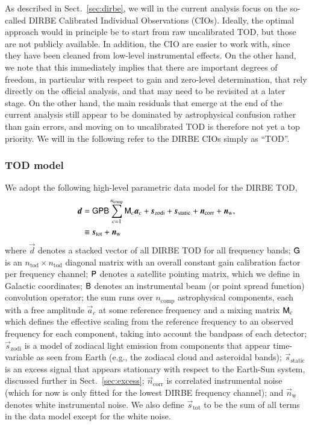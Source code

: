\documentclass{aa}
\newcommand{\dv}[0]{\vec{d}}
\newcommand{\B}[0]{\tens{B}}
\newcommand{\G}[0]{\tens{G}}
\newcommand{\n}[0]{\vec{n}}
\newcommand{\s}[0]{\vec{s}}
\renewcommand{\a}[0]{\vec{a}}
\newcommand{\M}[0]{\tens{M}}
\renewcommand{\P}[0]{\tens{P}}
\begin{document}
As described in Sect.~\ref{sec:dirbe}, we will in the current analysis
focus on the so-called DIRBE Calibrated Individual Observations
(CIOs). Ideally, the optimal approach would in principle be to start from raw uncalibrated TOD, but those are not
publicly available. In addition, the CIO are easier to work with,
since they have been cleaned from low-level instrumental effects. On
the other hand, we note that this immediately implies that there are
important degrees of freedom, in particular with respect to gain and
zero-level determination, that rely directly on the official analysis,
and that may need to be revisited at a later stage. On the other hand,
the main residuals that emerge at the end of the current analysis
still appear to be dominated by astrophysical confusion rather than
gain errors, and moving on to uncalibrated TOD is therefore not yet a
top priority. We will in the following refer to the DIRBE CIOs simply
as ``TOD''.

\subsubsection{TOD model}

We adopt the following high-level parametric data model for the DIRBE
TOD,
\begin{align}
	\label{eq:model}
	\dv &=\G\P\B\sum_{c=1}^{n_{\mathrm{comp}}}\M_c\a_c+\s_{\mathrm{zodi}} +
          \s_{\mathrm{static}} + \n_\mathrm{corr} + \n_\mathrm w,\\
        &\equiv \s_{\mathrm{tot}} + \n_{\mathrm{w}}
\end{align}
where $\dv$ denotes a stacked vector of all DIRBE TOD for all
frequency bands; $\G$ is an $n_{\mathrm{tod}}\times
n_{\mathrm{tod}}$ diagonal matrix with an overall constant gain
calibration factor per frequency channel; $\P$ denotes a satellite
pointing matrix, which we define in Galactic coordinates; $\B$ denotes
an instrumental beam (or point spread function) convolution operator;
the sum runs over $n_{\mathrm{comp}}$ astrophysical components, each
with a free amplitude $\a_c$ at some reference frequency and a mixing
matrix $\M_c$ which defines the effective scaling from the reference
frequency to an observed frequency for each component, taking into account the
bandpass of each detector; $\s_{\mathrm{zodi}}$ is a model of zodiacal
light emission from components that appear time-variable as seen from
Earth (e.g., the zodiacal cloud and asteroidal bands);
$\s_{\mathrm{static}}$ is an excess signal that appears stationary
with respect to the Earth-Sun system, discussed further in Sect.~\ref{sec:excess}; $\n_{\mathrm{corr}}$ is 
correlated instrumental noise (which for now is only fitted for the
lowest DIRBE frequency channel); and $\n_{\mathrm{w}}$ denotes white
instrumental noise. We also define $\s_{\mathrm{tot}}$ to be the sum
of all terms in the data model except for the white noise.
\end{document}
